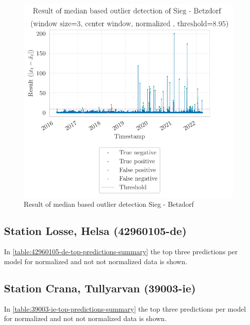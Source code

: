 \begin{figure}[htp]
    \centering 
    \includegraphics{plots/pdfs/2720050000-de/od_result_median_2720050000-de_all.pdf}
    \caption{Result of median based outlier detection Sieg - Betzdorf}
    \label{figure:od-result-example-202720050000-de}
\end{figure}



\subsection{Station Losse, Helsa (42960105-de)}
In \autoref{table:42960105-de-top-predictions-summary} the top three predictions per model for normalized and not not normalized data is shown.


\subsection{Station Crana, Tullyarvan (39003-ie)}
In \autoref{table:39003-ie-top-predictions-summary} the top three predictions per model for normalized and not not normalized data is shown.



